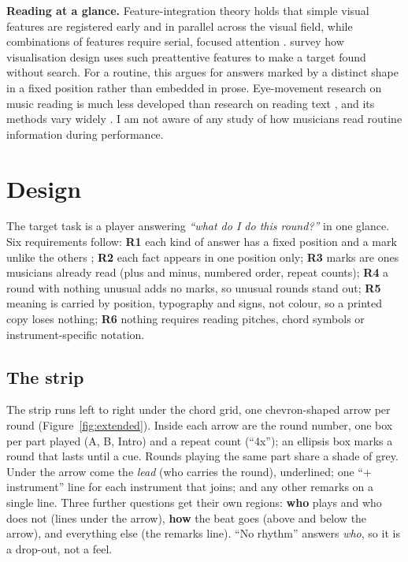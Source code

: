 \documentclass[10pt,twocolumn,a4paper]{article}
\begin{document}
\textbf{Reading at a glance.} Feature-integration theory holds that simple visual
features are registered early and in parallel across the visual field, while
combinations of features require serial, focused attention \citep{treisman1980}.
\citet{healey2012} survey how visualisation design uses such preattentive features to
make a target found without search. For a routine, this argues for answers marked by a
distinct shape in a fixed position rather than embedded in prose. Eye-movement
research on music reading is much less developed than research on reading text
\citep{madell2008}, and its methods vary widely \citep{puurtinen2018}. I am not aware
of any study of how musicians read routine information during performance.

\section{Design}\label{sec:design}

The target task is a player answering \emph{``what do I do this round?''} in one
glance. Six requirements follow: \textbf{R1} each kind of answer has a fixed position
and a mark unlike the others \citep{treisman1980,healey2012}; \textbf{R2} each fact
appears in one position only; \textbf{R3} marks are ones musicians already read (plus
and minus, numbered order, repeat counts); \textbf{R4} a round
with nothing unusual adds no marks, so unusual rounds stand out; \textbf{R5} meaning
is carried by position, typography and signs, not colour, so a printed copy loses
nothing; \textbf{R6} nothing requires reading pitches, chord symbols or
instrument-specific notation.

\subsection{The strip}

The strip runs left to right under the chord grid, one chevron-shaped arrow per round
(Figure~\ref{fig:extended}). Inside each arrow are the round number, one box per part
played (A, B, Intro) and a repeat count (``4x''); an ellipsis box marks a round that
lasts until a cue. Rounds playing the same part share a shade of grey. Under the
arrow come the \emph{lead} (who carries the round), underlined; one
``+\,instrument'' line for each instrument that joins; and any other remarks on a
single line. Three further questions get their own regions: \textbf{who} plays and who
does not (lines under the arrow), \textbf{how} the beat goes (above and below the
arrow), and everything else (the remarks line). ``No rhythm'' answers \emph{who}, so it
is a drop-out, not a feel.
\end{document}
